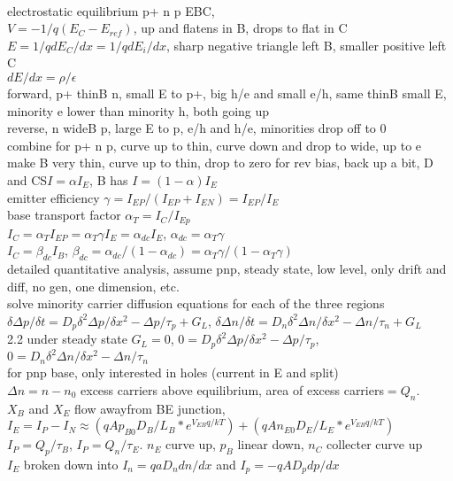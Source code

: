 \documentclass{article}
\begin{document}
\begin{large}
\\electrostatic equilibrium p+ n p EBC, 
\\$V=-1/q(E_C-E_{ref})$, up and flatens in B, drops to flat in C
\\$E=1/q dE_C/dx=1/q dE_i/dx$, sharp negative triangle left B, smaller positive left C
\\$dE/dx=\rho/\epsilon$
\\forward, p+ thinB n, small E to p+, big h/e and small e/h, same thinB small E, minority e lower than minority h, both going up
\\reverse, n wideB p, large E to p, e/h and h/e, minorities drop off to 0
\\combine for p+ n p, curve up to thin, curve down and drop to wide, up to e
\\make B very thin, curve up to thin, drop to zero for rev bias, back up a bit, D and CS$I=\alpha I_E$, B has $I=(1-\alpha)I_E$
\\emitter efficiency $\gamma=I_{EP}/(I_{EP}+I_{EN})=I_{EP}/I_E$
\\base transport factor $\alpha_T=I_C/I_{Ep}$
\\$I_C=\alpha_TI_{EP}=\alpha_T\gamma I_E=\alpha_{dc}I_E$, $\alpha_{dc}=\alpha_T\gamma$
\\$I_C=\beta_{dc}I_B$, $\beta_{dc}=\alpha_{dc}/(1-\alpha_{dc})=\alpha_T\gamma/(1-\alpha_T\gamma)$
\\detailed quantitative analysis, assume pnp, steady state, low level, only drift and diff, no gen, one dimension, etc.
\\solve minority carrier diffusion equations for each of the three regions
\\$\delta\Delta p/\delta t=D_p \delta^2\Delta p/\delta x^2-\Delta p/\tau_p+G_L$, $\delta\Delta n/\delta t=D_n \delta^2\Delta n/\delta x^2-\Delta n/\tau_n+G_L$
\\2.2 under steady state $G_L=0$, $0=D_p \delta^2\Delta p/\delta x^2-\Delta p/\tau_p$, $0=D_n \delta^2\Delta n/\delta x^2-\Delta n/\tau_n$
\\for pnp base, only interested in holes (current in E and split)
\\$\Delta n=n-n_0$ excess carriers above equilibrium, area of excess carriers$=Q_n$. 
\\$X_B$ and $X_E$ flow awayfrom BE junction, $I_E=I_P-I_N\approx (qAp_{B0}D_B/L_B*e^{V_{EB} q/kT})+(qAn_{E0}D_E/L_E*e^{V_{EB} q/kT})$
\\$I_P=Q_p/\tau_B$, $I_P=Q_n/\tau_E$. $n_E$ curve up, $p_B$ linear down, $n_C$ collecter curve up
\\$I_E$ broken down into $I_n=qaD_n dn/dx$ and $I_p=-qAD_p dp/dx$

\end{large}
\end{document}
